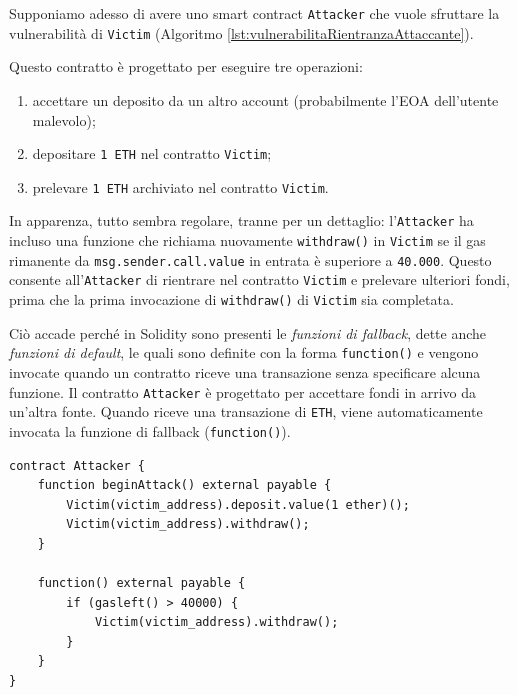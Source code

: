 Supponiamo adesso di avere uno smart contract {\tt Attacker} che vuole sfruttare la vulnerabilità di {\tt Victim} (Algoritmo \ref*{lst:vulnerabilitaRientranzaAttaccante}).

Questo contratto è progettato per eseguire tre operazioni:
\begin{enumerate}
    \item accettare un deposito da un altro account (probabilmente l'EOA dell'utente malevolo);
    \item depositare {\tt 1 ETH} nel contratto {\tt Victim};
    \item prelevare {\tt 1 ETH} archiviato nel contratto {\tt Victim}.
\end{enumerate}

In apparenza, tutto sembra regolare, tranne per un dettaglio: l'{\tt Attacker} ha incluso una funzione che richiama nuovamente {\tt withdraw()} in {\tt Victim} 
se il gas rimanente da {\tt msg.sender.call.value} in entrata è superiore a {\tt 40.000}. Questo consente all'{\tt Attacker} di rientrare nel contratto 
{\tt Victim} e prelevare ulteriori fondi, prima che la prima invocazione di {\tt withdraw()} di {\tt Victim} sia completata.

Ciò accade perché in Solidity sono presenti le \textit{funzioni di fallback}, dette anche \textit{funzioni di default}, le quali sono definite con la forma 
{\tt function()} e vengono invocate quando un contratto riceve una transazione senza specificare alcuna funzione.
Il contratto {\tt Attacker} è progettato per accettare fondi in arrivo da un'altra fonte. Quando riceve una transazione di {\tt ETH}, viene automaticamente 
invocata la funzione di fallback ({\tt function()}).

\begin{algorithm}[ht]
\caption{Smart contract che sfrutta la vulnerabilità dell'Algoritmo \ref*{lst:vulnerabilitaRientranzaVittima}.}
\label{lst:vulnerabilitaRientranzaAttaccante}
\begin{lstlisting}[style=customsolidity, language=Solidity]
contract Attacker {
    function beginAttack() external payable {
        Victim(victim_address).deposit.value(1 ether)();
        Victim(victim_address).withdraw();
    }

    function() external payable {
        if (gasleft() > 40000) {
            Victim(victim_address).withdraw();
        }
    }
}

\end{lstlisting}
\end{algorithm}

